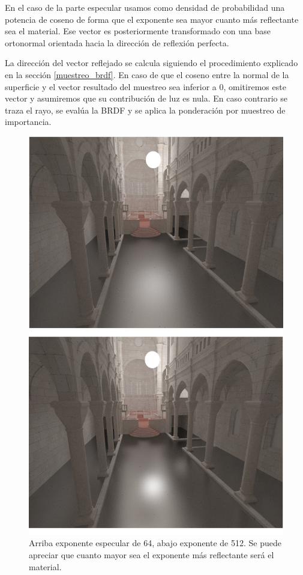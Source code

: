 En el caso de la parte especular usamos como densidad de probabilidad una potencia de coseno de forma que el exponente sea mayor cuanto más reflectante sea el material. Ese vector es posteriormente transformado con una base ortonormal orientada hacia la dirección de reflexión perfecta.

\medskip

La dirección del vector reflejado se calcula siguiendo el procedimiento explicado en la sección \ref{muestreo_brdf}. En caso de que el coseno entre la normal de la superficie y el vector resultado del muestreo sea inferior a 0, omitiremos este vector y asumiremos que su contribución de luz es nula. En caso contrario se traza el rayo, se evalúa la BRDF y se aplica la ponderación por muestreo de importancia.


\begin{figure}
\centering
\includegraphics[width=5in]{compare_specular2_burned.png}
\caption{Arriba exponente especular de 64, abajo exponente de 512. Se puede apreciar que cuanto mayor sea el exponente más reflectante será el material.}
\end{figure}

